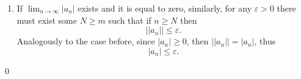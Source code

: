 \documentclass{article}
\theoremstyle{remark}
\begin{document}
\begin{enumerate}
\begin{enumerate}

            \item[$(\impliedby)$] If $\lim_{n\to\infty}\vert a_n \vert$ exists and it is equal to zero, similarly, for any $\varepsilon > 0$ 
            there must exist some $N \geq m$ such that if $n \geq N$ then 
            \[
            \vert \vert a_n \vert \vert \leq \varepsilon.
            \]
            Analogously to the case before, since $\vert a_n \vert \geq 0$, then $\vert \vert a_n \vert \vert = \vert a_n \vert$,
            thus 
            \[
            \vert a_n \vert \leq \varepsilon.
            \]
        \end{enumerate}
        \begin{flushright}
            \qed
        \end{flushright}


\end{enumerate}
\end{document}
